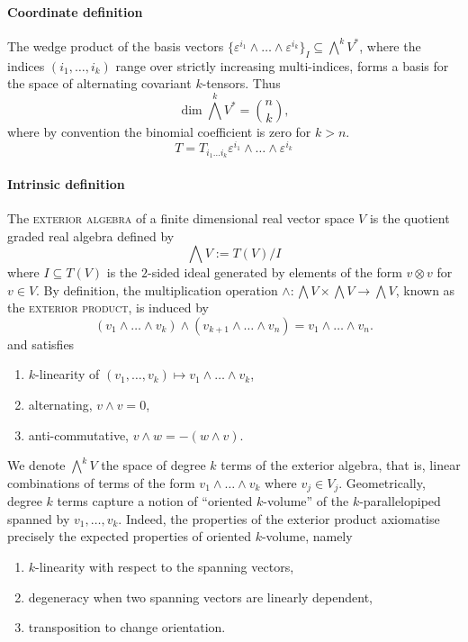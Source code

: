 \documentclass[reqno]{amsart}
\theoremstyle{definition}
\theoremstyle{remark}
\renewcommand{\epsilon}{\varepsilon}
\renewcommand{\emph}{\textsc}
\begin{document}
\paragraph*{\textbf{Coordinate definition}}

The wedge product of the basis vectors $\{ \epsilon^{i_1} \wedge \dots \wedge \epsilon^{i_k} \}_I \subseteq \bigwedge^k V^*$, where the indices $(i_1, \dots, i_k)$ range over strictly increasing multi-indices, forms a basis for the space of alternating covariant $k$-tensors. Thus 
	\[ \dim \bigwedge^k V^* = \binom{n}{k}, \]
where by convention the binomial coefficient is zero for $k > n$. 
	\[ T = T_{i_1 \dots i_k} \epsilon^{i_1} \wedge \dots \wedge \epsilon^{i_k}\]


\paragraph*{\textbf{Intrinsic definition}}


The \emph{exterior algebra} of a finite dimensional real vector space $V$ is the quotient graded real algebra defined by 
	\[ \bigwedge V := T(V) / I \]
where $I \subseteq T(V)$ is the $2$-sided ideal generated by elements of the form $v \otimes v$ for $v \in V$. By definition, the multiplication operation $\wedge : \bigwedge V \times \bigwedge V \to \bigwedge V$, known as the \emph{exterior product}, is induced by 
		\[ (v_1 \wedge \dots \wedge v_k) \wedge (v_{k + 1} \wedge \dots \wedge v_n) = v_1 \wedge \dots \wedge v_n. \]
and satisfies
\begin{enumerate}
	\item $k$-linearity of $(v_1, \dots, v_k) \mapsto v_1 \wedge \dots \wedge v_k$,
	\item alternating, $v \wedge v = 0$, 
	\item anti-commutative, $v \wedge w = -  (w \wedge v)$.
\end{enumerate}
We denote $\bigwedge^k V$ the space of degree $k$ terms of the exterior algebra, that is, linear combinations of terms of the form $v_1 \wedge \dots \wedge v_k$ where $v_j \in V_j$. Geometrically, degree $k$ terms capture a notion of ``oriented $k$-volume'' of the $k$-parallelopiped spanned by $v_1, \dots, v_k$. Indeed, the properties of the exterior product axiomatise precisely the expected properties of oriented $k$-volume, namely
\begin{enumerate}
	\item $k$-linearity with respect to the spanning vectors,
	\item degeneracy when two spanning vectors are linearly dependent,
	\item transposition to change orientation.
\end{enumerate}
\end{document}
